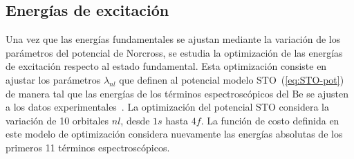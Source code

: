 \begin{comment}
Los resultados de la mejor optimización 
bayesiana de $\alpha_l$ y $\rho_l$ se muestran en la 
Fig.~\ref{fig:globmin}. En el panel superior se presenta la evaluación 
de la función de costo a medida que los procesos gaussianos exploran la
superficie hiper-dimensional de la función de costo. Cada uno de estos 
puntos se corresponde a un punto del espacio de parámetros, que se 
muestra en el panel inferior. El mínimo de la función de costo vecinos es 
hallado en la iteración 81; este punto y sus vecinos más cercanos 
($J\leq 0.245$) se muestran con símbolos de color negro. Los parámetros 
que le corresponden a dichas evaluaciones también se muestran en la parte
inferior con símbolos de color negro.

\begin{figure}
\centering
\texttt{[image: figures/rmatrix/Jpol\_globmin.pdf]}
\texttt{[image: figures/rmatrix/params\_globmin.pdf]}
\caption[Minimización de la función de costo y exploración de parámetros.]
{(Panel superior) Optimización bayesiana de la función de costo dada por 
la ecuación~(\ref{eq:Jpol}). (Panel inferior) Exploración del 
hiper-espacio de parámetros correspondiente.}
\label{fig:globmin}
\end{figure}
\end{comment}


\subsection{Energías de excitación}

Una vez que las energías fundamentales se ajustan mediante la variación 
de los parámetros del potencial de Norcross, se estudia la optimización 
de las energías de excitación respecto al estado fundamental. Esta 
optimización consiste en ajustar los parámetros $\lambda_{nl}$ que 
definen al potencial modelo STO~(\ref{eq:STO-pot}) de manera tal que las 
energías de los términos espectroscópicos del Be se ajusten a los datos 
experimentales~\cite{NIST}. 
La optimización del potencial STO considera la variación de 10 orbitales 
$nl$, desde $1s$ hasta $4f$. La función de costo definida en este modelo 
de optimización considera nuevamente las energías absolutas de los 
primeros 11 términos espectroscópicos. 

